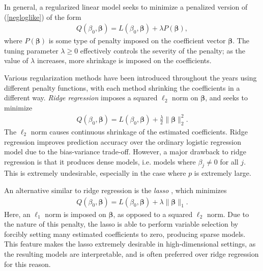 \documentclass[11pt]{article}
\begin{document}


In general, a regularized linear model seeks to minimize a penalized version of (\ref{negloglike}) of the form
\begin{align*}
    Q(\beta_0, \bm{\beta}) = L(\beta_0, \bm{\beta}) + \lambda P(\bm{\beta}),
\end{align*}
where $P(\bm{\beta})$ is some type of penalty imposed on the coefficient vector $\bm{\beta}$. The tuning parameter $\lambda \ge 0$ effectively controls the severity of the penalty; as the value of $\lambda$ increases, more shrinkage is imposed on the coefficients. 

Various regularization methods have been introduced throughout the years using different penalty functions, with each method shrinking the coefficients in a different way. \textit{Ridge regression} \cite{hoerl1970ridge} imposes a squared $\ell_2$ norm on $\bm{\beta}$, and seeks to minimize 
\begin{align}
    \label{ridgeregression}
    Q(\beta_0, \bm{\beta}) = L(\beta_0, \bm{\beta}) + \frac{\lambda}{2} \| \bm{\beta} \|_2^2.
\end{align}
The $\ell_2$ norm causes continuous shrinkage of the estimated coefficients. Ridge regression improves prediction accuracy over the ordinary logistic regression model due to the bias-variance trade-off. However, a major drawback to ridge regression is that it produces dense models, i.e. models where $\beta_j \not = 0$ for all $j$. This is extremely undesirable, especially in the case where $p$ is extremely large. 

An alternative similar to ridge regression is the \textit{lasso} \cite{tibshirani1996regression}, which minimizes 
\begin{align}
    \label{lasso}
    Q(\beta_0, \bm{\beta}) = L(\beta_0, \bm{\beta}) + \lambda \| \bm{\beta} \|_1.
\end{align}
Here, an $\ell_1$ norm is imposed on $\bm{\beta}$, as opposed to a squared $\ell_2$ norm. Due to the nature of this penalty, the lasso is able to perform variable selection by forcibly setting many estimated coefficients to zero, producing sparse models. This feature makes the lasso extremely desirable in high-dimensional settings, as the resulting models are interpretable, and is often preferred over ridge regression for this reason.
\end{document}
